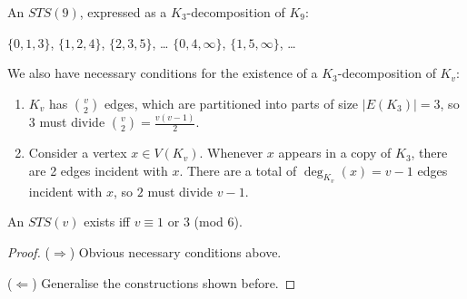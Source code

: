 \begin{frame}

An $STS(9)$, expressed as a $K_3$-decomposition of $K_{9}$:

\begin{center}
\quad \quad \quad
{}
\end{center}

$\{0, 1, 3\}$, $\{1, 2, 4\}$, $\{2, 3, 5\}$, \ldots
\hspace{1cm}%
$\{0,4,\infty\}$, $\{1, 5, \infty\}$, \ldots

\end{frame}

\begin{frame}

We also have necessary conditions for the existence of a $K_3$-decomposition of $K_v$:

\begin{enumerate}
    \pause
    \item $K_v$ has ${v \choose 2}$ edges, which are partitioned
    into parts of size $|E(K_3)| = 3$, so $3$ must divide ${v \choose 2} = \frac{v(v-1)}{2}$.
    \pause
    \item Consider a vertex $x \in V(K_v)$. Whenever $x$ appears in a copy of
    $K_3$, there are 2 edges incident with $x$. There are a total of
    $\deg_{K_v}(x) = v-1$ edges incident with $x$, so $2$ must divide $v-1$.
\end{enumerate}
\pause

\begin{theorem}[Kirkman, 1847]
An $STS(v)$ exists iff $v \equiv 1$ or $3$ (mod $6$).
\end{theorem}


\begin{proof}
($\Rightarrow$) Obvious necessary conditions above.

($\Leftarrow$) Generalise the constructions shown before.
\end{proof}

\end{frame}

